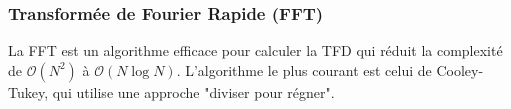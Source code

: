 


\subsubsection{Transformée de Fourier Rapide (FFT)}{}
La FFT est un algorithme efficace pour calculer la TFD qui réduit la complexité de $\mathcal{O}(N^2)$ à $\mathcal{O}(N \log N)$. L'algorithme le plus courant est celui de Cooley-Tukey, qui utilise une approche "diviser pour régner".

